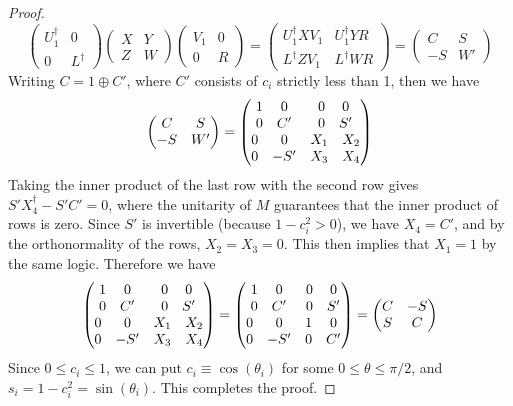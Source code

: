 \documentclass[11pt]{article}
\begin{document}
\begin{proof}
    $$
    \begin{pmatrix}U_1^\dagger & 0 \\ 0 & L^\dagger\end{pmatrix}\begin{pmatrix}X & Y \\ Z & W\end{pmatrix} \begin{pmatrix}V_1 & 0 \\ 0 & R\end{pmatrix} = \begin{pmatrix}U_1^\dagger X V_1 & U^\dagger_1YR \\  L^\dagger ZV_1 & L^\dagger WR\end{pmatrix} = \begin{pmatrix}C & S \\ -S & W'\end{pmatrix}
    $$
    Writing $C = 1 \oplus C'$, where $C'$ consists of $c_i$ strictly less than 1, then we have
$$
    \begin{pmatrix}C & S \\ -S & W'\end{pmatrix} = \begin{pmatrix}\mqty{1 & 0 \\ 0 & C'}  & \mqty{0 & 0 \\ 0 & S'} \\ \mqty{0 & 0 \\ 0 & -S'} & \mqty{X_1 & X_2 \\ X_3 & X_4}\end{pmatrix}
$$
Taking the inner product of the last row with the second row gives $S'X_4^\dagger-S'C' = 0$, where the unitarity of $M$ guarantees that the inner product of rows is zero. Since $S'$ is invertible (because $1-c_i^2 > 0$), we have $X_4 = C'$, and by the orthonormality of the rows, $X_2 = X_3 = 0$. This then implies that $X_1 = 1$ by the same logic. Therefore we have
$$
    \begin{pmatrix}\mqty{1 & 0 \\ 0 & C'}  & \mqty{0 & 0 \\ 0 & S'} \\ \mqty{0 & 0 \\ 0 & -S'} & \mqty{X_1 & X_2 \\ X_3 & X_4}\end{pmatrix} = \begin{pmatrix}\mqty{1 & 0 \\ 0 & C'}  & \mqty{0 & 0 \\ 0 & S'} \\ \mqty{0 & 0 \\ 0 & -S'} & \mqty{1 & 0 \\ 0 & C'}\end{pmatrix} =\begin{pmatrix}C & -S \\ S & C\end{pmatrix}
$$
Since $0 \leq c_i \leq 1$, we can put $c_i \equiv \cos(\theta_i)$ for some $0 \leq \theta \leq \pi/2$, and $s_i = 1-c_i^2 = \sin(\theta_i)$. This completes the proof.
\end{proof}
\end{document}
